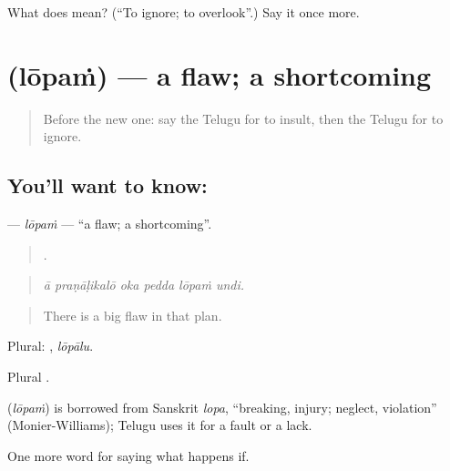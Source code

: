 \begin{tcolorbox}[breakable,colback=teal!4,colframe=teal!35!black,title={Before you move on}]
What does  mean? (\textquotedblleft{}To ignore; to overlook\textquotedblright{}.) Say it once more.
\end{tcolorbox}
\section[\texorpdfstring{\te{లోపం} (lōpaṁ)}{లోపం (lōpaṁ)}]{ (lōpaṁ) — a flaw; a shortcoming}

\label{lesson:TE-C428-lopam}



\begin{quote}
Before the new one: say the Telugu for to insult, then the Telugu for to ignore.
\end{quote}

\subsection*{You'll want to know: }
\textbf{} — \emph{lōpaṁ} — \textquotedblleft{}a flaw; a shortcoming\textquotedblright{}.

\begin{quote}
     .
\end{quote}

\begin{quote}
\emph{ā praṇāḷikalō oka pedda lōpaṁ undi.}
\end{quote}

\begin{quote}
There is a big flaw in that plan.
\end{quote}

Plural: , \emph{lōpālu}.

Plural .

\begin{cousinweb}
\textbf{} (\emph{lōpaṁ}) is borrowed from Sanskrit \emph{lopa}, \textquotedblleft{}breaking, injury; neglect, violation\textquotedblright{} (Monier-Williams); Telugu uses it for a fault or a lack.
\end{cousinweb}

\begin{grammarlens}[title={What you've built}]
One more word for saying what happens if.
\end{grammarlens}

